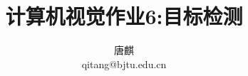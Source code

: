\documentclass[10pt,journal,compsoc]{IEEEtran}
\begin{document}
\begin{sloppypar}

\title{计算机视觉作业­6:目标检测}

\author{唐麒\\qitang@bjtu.edu.cn}




\maketitle






\ifCLASSOPTIONcaptionsoff
  \newpage
\fi



%
%

\end{sloppypar}
\end{document}
